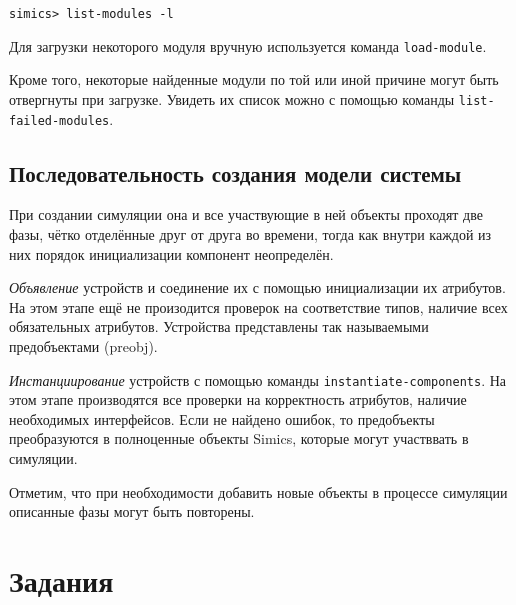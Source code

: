 \begin{lstlisting}
simics> list-modules -l
\end{lstlisting}

Для загрузки некоторого модуля вручную используется команда \texttt{load-module}.

Кроме того, некоторые найденные модули по той или иной причине могут быть отвергнуты при загрузке. Увидеть их список можно с помощью команды \texttt{list-failed-modules}.

% 

\subsection{Последовательность создания модели системы}

При создании симуляции она и все участвующие в ней объекты проходят две фазы, чётко отделённые друг от друга во времени, тогда как внутри каждой из них порядок инициализации компонент неопределён.

\begin{enumerate*}

\item \textit{Объявление} устройств и соединение их с помощью инициализации их атрибутов. На этом этапе ещё не произодится проверок на соответствие типов, наличие всех обязательных атрибутов. Устройства представлены так называемыми предобъектами (\abbr preobj).

\item \textit{Инстанциирование} устройств с помощью команды \texttt{instantiate-components}. На этом этапе производятся все проверки на корректность атрибутов, наличие необходимых интерфейсов. Если не найдено ошибок, то предобъекты преобразуются в полноценные объекты Simics, которые могут участввать в симуляции.

\end{enumerate*}

Отметим, что при необходимости добавить новые объекты в процессе симуляции описанные фазы могут быть повторены.

\section{Задания}

